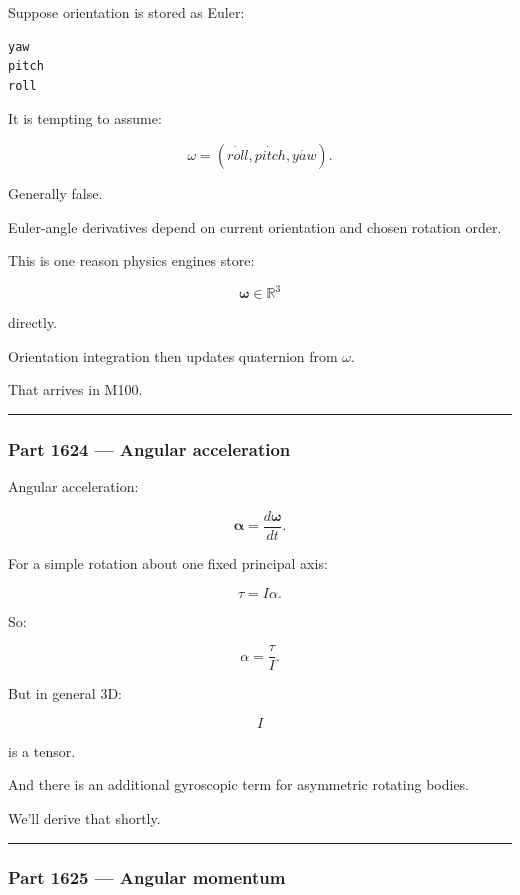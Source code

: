 Suppose orientation is stored as Euler:

\begin{verbatim}
yaw
pitch
roll
\end{verbatim}

It is tempting to assume:

\[
\omega
=
(\dot{roll},\dot{pitch},\dot{yaw}).
\]

Generally false.

Euler-angle derivatives depend on current orientation and chosen rotation order.

This is one reason physics engines store:

\[
\boldsymbol{\omega}\in\mathbb{R}^3
\]

directly.

Orientation integration then updates quaternion from \(\omega\).

That arrives in M100.

\begin{center}\rule{0.5\linewidth}{0.5pt}\end{center}

\subsubsection{Part 1624 --- Angular acceleration}\label{part-1624-angular-acceleration}

Angular acceleration:

\[
\boxed{
\boldsymbol{\alpha}
=
\frac{d\boldsymbol{\omega}}{dt}.
}
\]

For a simple rotation about one fixed principal axis:

\[
\tau=I\alpha.
\]

So:

\[
\alpha
=
\frac{\tau}{I}.
\]

But in general 3D:

\[
I
\]

is a tensor.

And there is an additional gyroscopic term for asymmetric rotating bodies.

We'll derive that shortly.

\begin{center}\rule{0.5\linewidth}{0.5pt}\end{center}

\subsubsection{Part 1625 --- Angular momentum}\label{part-1625-angular-momentum}

